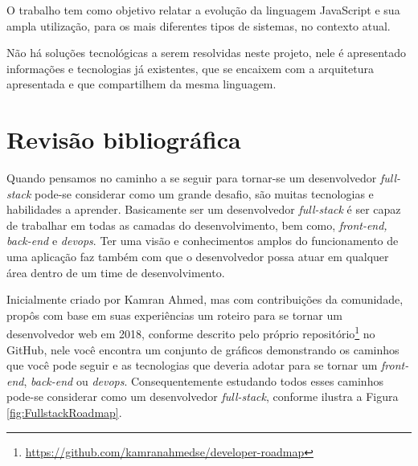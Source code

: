 \documentclass[
	12pt,				%
	openright,			%
	twoside,			%
	a4paper,			%
	english,			%
	brazil				%
	]{abntex2}
\begin{document}
O trabalho tem como objetivo relatar a evolução da linguagem JavaScript e sua ampla utilização, para os mais diferentes tipos de sistemas, no contexto atual.

Não há soluções tecnológicas a serem resolvidas neste projeto, nele é apresentado informações e tecnologias já existentes, que se encaixem com a arquitetura apresentada e que compartilhem da mesma linguagem.

\chapter{Revisão bibliográfica}


Quando pensamos no caminho a se seguir para tornar-se um desenvolvedor \textit{full-stack} pode-se considerar como um grande desafio, são muitas tecnologias e habilidades a aprender. Basicamente ser um desenvolvedor \textit{full-stack} é ser capaz de trabalhar em todas as camadas do desenvolvimento, bem como, \textit{front-end, back-end} e \textit{devops}. Ter uma visão e conhecimentos amplos do funcionamento de uma aplicação faz também com que o desenvolvedor possa atuar em qualquer área dentro de um time de desenvolvimento.

Inicialmente criado por Kamran Ahmed\cite{ahmedse_roadmap}, mas com contribuições da comunidade, propôs com base em suas experiências um roteiro para se tornar um desenvolvedor web em 2018, conforme descrito pelo próprio repositório\footnote{\url{https://github.com/kamranahmedse/developer-roadmap}} no GitHub, nele você encontra um conjunto de gráficos demonstrando os caminhos que você pode seguir e as tecnologias que deveria adotar para se tornar um \textit{front-end}, \textit{back-end} ou \textit{devops}. Consequentemente estudando todos esses caminhos pode-se considerar como um desenvolvedor \textit{full-stack}, conforme ilustra a Figura \ref{fig:FullstackRoadmap}.
\end{document}

